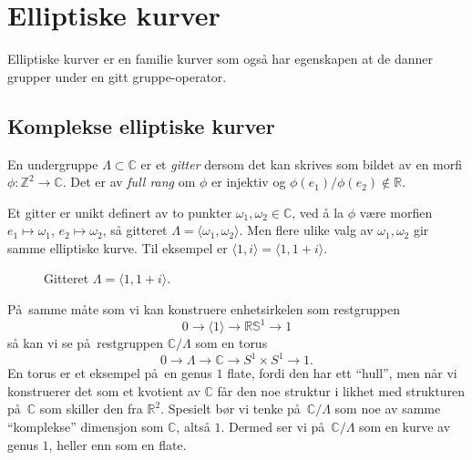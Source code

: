 \section{Elliptiske kurver}

Elliptiske kurver er en familie kurver som også har egenskapen at de danner grupper
under en gitt gruppe-operator.
\cite{silverman_arithmetic_2009}

\subsection{Komplekse elliptiske kurver}
\begin{definition}
    En undergruppe $\Lambda\subset \mathbb C$ er et \textit{gitter}
    dersom det kan skrives som bildet av en morfi $\phi\colon \mathbb Z^2\to \mathbb C$.
    Det er av \textit{full rang} om $\phi$ er injektiv
    og $\phi(e_1) / \phi(e_2)\notin \mathbb R$.
\end{definition}

Et gitter er unikt definert av to punkter $\omega_1, \omega_2\in \mathbb C$,
ved å la $\phi$ være morfien $e_1\mapsto \omega_1$, $e_2\mapsto \omega_2$,
så gitteret $\Lambda = \langle \omega_1, \omega_2\rangle$.
Men flere ulike valg av $\omega_1, \omega_2$ gir samme elliptiske kurve.
Til eksempel er $\langle 1, i\rangle = \langle 1, 1 + i\rangle$.
\begin{figure}[htb]
    \centering
    \caption{Gitteret $\Lambda = \langle 1, 1 + i\rangle$.}
\end{figure}

På samme måte som vi kan konstruere enhetsirkelen som restgruppen
\[
    0
    \to \langle 1\rangle
    \to \mathbb R
    \mathbb S^1
    \to 1
\]
så kan vi se på restgruppen $\mathbb C / \Lambda$
som en torus
\[
    0
    \to \Lambda
    \to \mathbb C
    \to S^1\times S^1
    \to 1.
\]
En torus er et eksempel på en genus $1$ flate,
fordi den har ett ``hull'',
men når vi konstruerer det som et kvotient av $\mathbb C$
får den noe struktur i likhet med strukturen på $\mathbb C$
som skiller den fra $\mathbb R^2$.
Spesielt bør vi tenke på $\mathbb C / \Lambda$ som noe av
samme ``komplekse'' dimensjon som $\mathbb C$,
altså $1$.
Dermed ser vi på $\mathbb C / \Lambda$ som en kurve av genus $1$,
heller enn som en flate.



